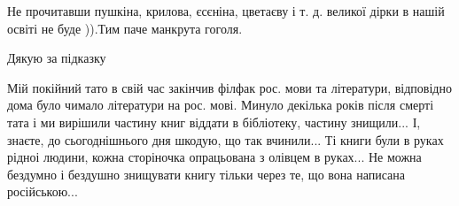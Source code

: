 
 
 
 
 

 
Не прочитавши пушкіна, крилова, єсєніна, цветаєву і т. д. великої дірки в нашій освіті не буде )).Тим паче манкрута гоголя.

 
Дякую за підказку

 

Мій покійний тато в свій час закінчив філфак рос. мови та літератури, відповідно
дома було чимало літератури на рос. мові. Минуло декілька років після смерті тата
і ми вирішили частину книг віддати в бібліотеку, частину знищили... І, знаєте, до
сьогоднішнього дня шкодую, що так вчинили... Ті книги були в руках рідноі
людини, кожна сторіночка опрацьована з олівцем в руках... Не можна бездумно і
бездушно знищувати книгу тільки через те, що вона написана російською...

